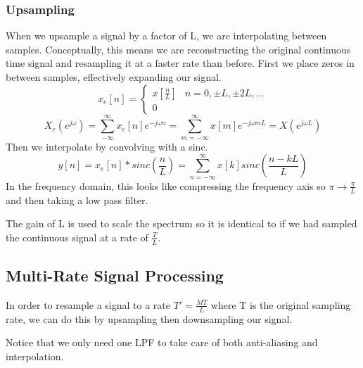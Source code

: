 \documentclass{article}
\begin{document}
\subsubsection{Upsampling}
When we upsample a signal by a factor of L, we are interpolating between samples. Conceptually, this means we are
reconstructing the original continuous time signal and resampling it at a faster rate than before.
First we place zeros in between samples, effectively expanding our signal.
\[
  x_e[n] = \begin{cases}
    x\left[\frac{n}{L}\right] & n=0, \pm L, \pm 2L,...\\
    0
  \end{cases}
\]
$$X_e(e^{j\omega})=\sum_{-\infty}^{\infty}x_e[n]e^{-j\omega n}=\sum_{m=-\infty}^{\infty}x[m]e^{-j\omega mL} = X\left(e^{j\omega L}\right)$$
Then we interpolate by convolving with a sinc.
$$y[n] = x_e[n]*sinc\left(\frac{n}{L}\right) = \sum_{n=-\infty}^{\infty}{x[k]sinc\left(\frac{n-kL}{L}\right)}$$
In the frequency domain, this looks like compressing the frequency axis so $\pi \rightarrow \frac{\pi}{L}$ and then taking a low pass filter.
\begin{figure}[H]
  \centering
\end{figure}
The gain of L is used to scale the spectrum so it is identical to if we had sampled the continuous signal at a rate of $\frac{T}{L}$.
\subsection{Multi-Rate Signal Processing}
In order to resample a signal to a rate $T'=\frac{MT}{L}$ where T is the original sampling rate, we can do this by upsampling then downsampling our signal.
\begin{figure}[H]
  \centering
\end{figure}
Notice that we only need one LPF to take care of both anti-aliasing and interpolation.
\end{document}
